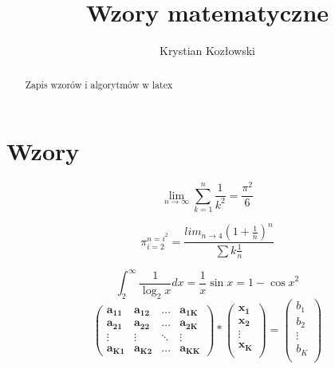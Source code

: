 \documentclass[a4paper,12pt]{article}
\title{Wzory matematyczne}
\author{Krystian Kozłowski}
\begin{document}
\maketitle

\begin{abstract}
Zapis wzorów i algorytmów w latex
\end{abstract}

\section{Wzory}
$$\lim_{n \to \infty}
\sum_{k=1}^n \frac{1}{k^2}
= \frac{\pi^2}{6}$$


$$\pi_{i=2}^{n=i^2} = \frac{lim_{n \to 4}(1+ \frac{1}{n})^n}{\sum k\frac{1}{n}}$$

$$\int_{2}^{\infty} \frac{1}{\log_{2}{x}}dx = \frac{1}{x} \sin x  =  {1- \cos x}^{2}
$$
$$
\mathbf{\left( \begin{array}{cccc}
a_{11} & a_{12} & \ldots & a_{1K} \\
a_{21} & a_{22} & \ldots & a_{2K} \\
\vdots & \vdots & \ddots & \vdots \\
a_{K1} & a_{K2} & \ldots & a_{KK} 
\end{array} \right) * 
\left( \begin{array}{c}
x_{1} \\
x_{2} \\
\vdots \\
x_{K} \\
\end{array} \right)

} =
\left( \begin{array}{c}
b_{1} \\
b_{2} \\ 
\vdots \\
b_{K} \\
\end{array} \right)
     $$
\end{document}
